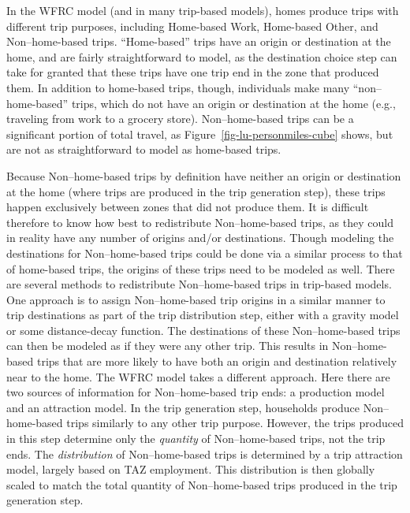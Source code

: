 \documentclass[fancy, oneside, mastersfancy, ms]{byuthesis}
\begin{document}
In the WFRC model (and in many trip-based models), homes produce trips
with different trip purposes, including Home-based Work, Home-based
Other, and Non--home-based trips. ``Home-based'' trips have an origin or
destination at the home, and are fairly straightforward to model, as the
destination choice step can take for granted that these trips have one
trip end in the zone that produced them. In addition to home-based
trips, though, individuals make many ``non--home-based'' trips, which do
not have an origin or destination at the home (e.g., traveling from work
to a grocery store). Non--home-based trips can be a significant portion
of total travel, as Figure~\ref{fig-lu-personmiles-cube} shows, but are
not as straightforward to model as home-based trips.

Because Non--home-based trips by definition have neither an origin or
destination at the home (where trips are produced in the trip generation
step), these trips happen exclusively between zones that did not produce
them. It is difficult therefore to know how best to redistribute
Non--home-based trips, as they could in reality have any number of
origins and/or destinations. Though modeling the destinations for
Non--home-based trips could be done via a similar process to that of
home-based trips, the origins of these trips need to be modeled as well.
There are several methods to redistribute Non--home-based trips in
trip-based models. One approach is to assign Non--home-based trip
origins in a similar manner to trip destinations as part of the trip
distribution step, either with a gravity model or some distance-decay
function. The destinations of these Non--home-based trips can then be
modeled as if they were any other trip. This results in Non--home-based
trips that are more likely to have both an origin and destination
relatively near to the home. The WFRC model takes a different approach.
Here there are two sources of information for Non--home-based trip ends:
a production model and an attraction model. In the trip generation step,
households produce Non--home-based trips similarly to any other trip
purpose. However, the trips produced in this step determine only the
\emph{quantity} of Non--home-based trips, not the trip ends. The
\emph{distribution} of Non--home-based trips is determined by a trip
attraction model, largely based on TAZ employment. This distribution is
then globally scaled to match the total quantity of Non--home-based
trips produced in the trip generation step.
\end{document}
